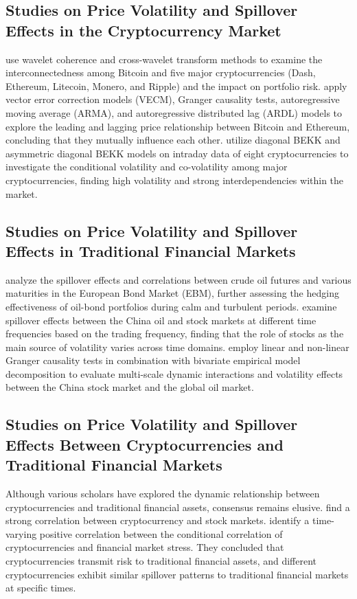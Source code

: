 \documentclass{article}
\begin{document}
\subsection{Studies on Price Volatility and Spillover Effects in the Cryptocurrency Market}
\cite{mensi2019cryptocurrency} use wavelet coherence and cross-wavelet transform methods to examine the interconnectedness among Bitcoin and five major cryptocurrencies (Dash, Ethereum, Litecoin, Monero, and Ripple) and the impact on portfolio risk. \cite{sifat2019} apply vector error correction models (VECM), Granger causality tests, autoregressive moving average (ARMA), and autoregressive distributed lag (ARDL) models to explore the leading and lagging price relationship between Bitcoin and Ethereum, concluding that they mutually influence each other. \cite{katsiampa2019} utilize diagonal BEKK and asymmetric diagonal BEKK models on intraday data of eight cryptocurrencies to investigate the conditional volatility and co-volatility among major cryptocurrencies, finding high volatility and strong interdependencies within the market.

\subsection{Studies on Price Volatility and Spillover Effects in Traditional Financial Markets}
\cite{mensi2021oil} analyze the spillover effects and correlations between crude oil futures and various maturities in the European Bond Market (EBM), further assessing the hedging effectiveness of oil-bond portfolios during calm and turbulent periods. \cite{sun2021spillover} examine spillover effects between the China oil and stock markets at different time frequencies based on the trading frequency, finding that the role of stocks as the main source of volatility varies across time domains. \cite{peng2020dynamic} employ linear and non-linear Granger causality tests in combination with bivariate empirical model decomposition to evaluate multi-scale dynamic interactions and volatility effects between the China stock market and the global oil market.

\subsection{Studies on Price Volatility and Spillover Effects Between Cryptocurrencies and Traditional Financial Markets}

Although various scholars have explored the dynamic relationship between cryptocurrencies and traditional financial assets, consensus remains elusive. \cite{dyhrberg2016b} find a strong correlation between cryptocurrency and stock markets. \cite{akyildirim2020relationship} identify a time-varying positive correlation between the conditional correlation of cryptocurrencies and financial market stress. They concluded that cryptocurrencies transmit risk to traditional financial assets, and different cryptocurrencies exhibit similar spillover patterns to traditional financial markets at specific times.
\end{document}
